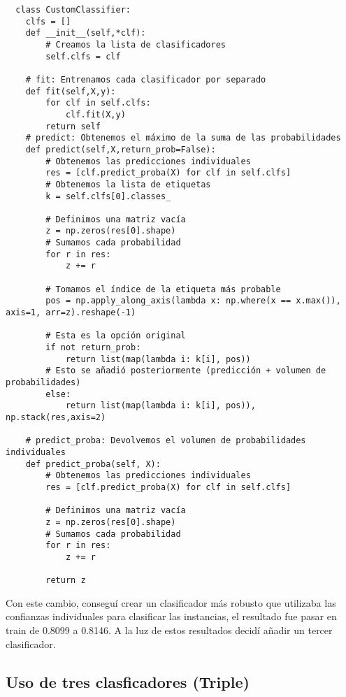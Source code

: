 \documentclass{article}
\begin{document}
\begin{verbatim}
  class CustomClassifier:
    clfs = []
    def __init__(self,*clf):
        # Creamos la lista de clasificadores
        self.clfs = clf

    # fit: Entrenamos cada clasificador por separado
    def fit(self,X,y):
        for clf in self.clfs:
            clf.fit(X,y)
        return self
    # predict: Obtenemos el máximo de la suma de las probabilidades
    def predict(self,X,return_prob=False):
        # Obtenemos las predicciones individuales
        res = [clf.predict_proba(X) for clf in self.clfs]
        # Obtenemos la lista de etiquetas
        k = self.clfs[0].classes_

        # Definimos una matriz vacía
        z = np.zeros(res[0].shape)
        # Sumamos cada probabilidad
        for r in res:
            z += r
        
        # Tomamos el índice de la etiqueta más probable
        pos = np.apply_along_axis(lambda x: np.where(x == x.max()), axis=1, arr=z).reshape(-1)
        
        # Esta es la opción original
        if not return_prob:
            return list(map(lambda i: k[i], pos))
        # Esto se añadió posteriormente (predicción + volumen de probabilidades)
        else:
            return list(map(lambda i: k[i], pos)), np.stack(res,axis=2)
    
    # predict_proba: Devolvemos el volumen de probabilidades individuales
    def predict_proba(self, X):
        # Obtenemos las predicciones individuales
        res = [clf.predict_proba(X) for clf in self.clfs]

        # Definimos una matriz vacía
        z = np.zeros(res[0].shape)
        # Sumamos cada probabilidad
        for r in res:
            z += r

        return z
\end{verbatim}

Con este cambio, conseguí crear un clasificador más robusto que utilizaba las confianzas individuales para clasificar las instancias, el resultado fue pasar en train de 0.8099 a 0.8146. A la luz de estos resultados decidí añadir un tercer clasificador.

\subsection{Uso de tres clasficadores (Triple)}
\end{document}
